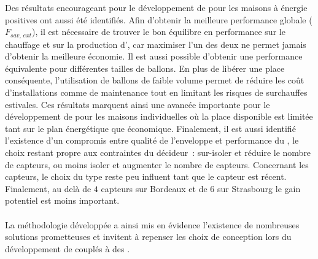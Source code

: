 Des résultats encourageant pour le développement de  pour les maisons à énergie
positives ont aussi été identifiés. Afin d’obtenir la meilleure performance globale
($F_{sav,\, ext}$), il est nécessaire de trouver le bon équilibre en performance sur le
chauffage et sur la production d’, car maximiser l’un des deux ne permet jamais
d’obtenir la meilleure économie. Il est aussi possible d’obtenir une performance
équivalente pour différentes tailles de ballons. En plus de libérer une place conséquente,
l’utilisation de ballons de faible volume permet de réduire les coût d’installations comme
de maintenance tout en limitant les risques de surchauffes estivales. Ces résultats
marquent ainsi une avancée importante pour le développement de
 pour les maisons individuelles où la place disponible est limitée tant sur le
plan énergétique que économique.
Finalement, il est aussi identifié l’existence d’un compromis entre qualité de l’enveloppe et
performance du , le choix restant propre aux contraintes du décideur~: sur-isoler
et réduire le nombre de capteurs, ou moins isoler et augmenter le nombre de capteurs.
Concernant les capteurs, le choix du type reste peu influent tant que le capteur
est récent. Finalement, au delà de $4$ capteurs sur Bordeaux et de $6$ sur Strasbourg le
gain potentiel est moins important.

\paragraph{} %
La méthodologie développée a ainsi mis en évidence l’existence de nombreuses solutions
prometteuses et invitent à repenser les choix de conception lors du développement de
 couplés à des .
